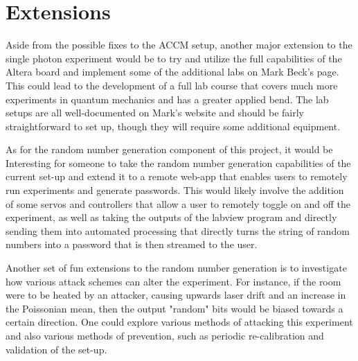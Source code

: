 \documentclass[letterpaper, 11 pt]{article}
\begin{document}
\section{Extensions}

Aside from the possible fixes to the ACCM setup, another major extension to the single photon experiment
would be to try and utilize the full capabilities of the Altera board and implement some of the additional
labs on Mark Beck's page. This could lead to the development of a full lab course that covers much more
experiments in quantum mechanics and has a greater applied bend. The lab setups are all well-documented on Mark's
website and should be fairly straightforward to set up, though they will require some additional
equipment.

As for the random number generation component of this project, it would be Interesting
for someone to take the random number generation capabilities of the current set-up and extend it
to a remote web-app that enables users to remotely run experiments and generate passwords.
This would likely involve the addition of some servos and controllers that allow a user to remotely
toggle on and off the experiment, as well as taking the outputs of the labview program and directly
sending them into automated processing that directly turns the string of random numbers into a password that
is then streamed to the user.

Another set of fun extensions to the random number generation is to investigate how various
attack schemes can alter the experiment. For instance, if the room were to be heated by an attacker,
causing upwards laser drift and an increase in the Poissonian mean, then the output "random" bits
would be biased towards a certain direction. One could explore various methods of attacking this experiment
and also various methods of prevention, such as periodic re-calibration and validation of the set-up.
%

\end{document}
